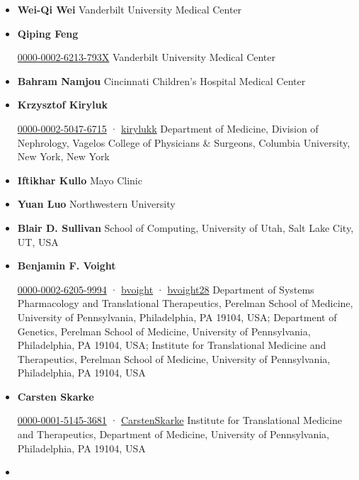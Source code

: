 \documentclass[
        11pt,
]{article}
\begin{document}
\begin{itemize}
\item
  \textbf{Wei-Qi Wei}
  Vanderbilt University Medical Center
\item
  \textbf{Qiping Feng}
  
  \href{https://orcid.org/0000-0002-6213-793X}{0000-0002-6213-793X}
  Vanderbilt University Medical Center
\item
  \textbf{Bahram Namjou}
  Cincinnati Children's Hospital Medical Center
\item
  \textbf{Krzysztof Kiryluk}
  
  \href{https://orcid.org/0000-0002-5047-6715}{0000-0002-5047-6715}
  · 
  \href{https://twitter.com/kirylukk}{kirylukk}
  Department of Medicine, Division of Nephrology, Vagelos College of Physicians \& Surgeons, Columbia University, New York, New York
\item
  \textbf{Iftikhar Kullo}
  Mayo Clinic
\item
  \textbf{Yuan Luo}
  Northwestern University
\item
  \textbf{Blair D. Sullivan}
  School of Computing, University of Utah, Salt Lake City, UT, USA
\item
  \textbf{Benjamin F. Voight}
  
  \href{https://orcid.org/0000-0002-6205-9994}{0000-0002-6205-9994}
  · 
  \href{https://github.com/bvoight}{bvoight}
  · 
  \href{https://twitter.com/bvoight28}{bvoight28}
  Department of Systems Pharmacology and Translational Therapeutics, Perelman School of Medicine, University of Pennsylvania, Philadelphia, PA 19104, USA; Department of Genetics, Perelman School of Medicine, University of Pennsylvania, Philadelphia, PA 19104, USA; Institute for Translational Medicine and Therapeutics, Perelman School of Medicine, University of Pennsylvania, Philadelphia, PA 19104, USA
\item
  \textbf{Carsten Skarke}
  
  \href{https://orcid.org/0000-0001-5145-3681}{0000-0001-5145-3681}
  · 
  \href{https://twitter.com/CarstenSkarke}{CarstenSkarke}
  Institute for Translational Medicine and Therapeutics, Department of Medicine, University of Pennsylvania, Philadelphia, PA 19104, USA
\item

\end{itemize}
\end{document}
